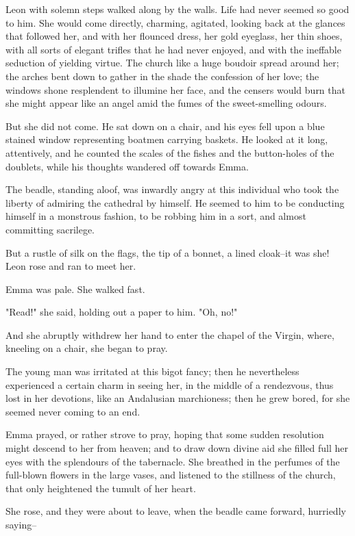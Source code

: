 \documentclass{tufte-book}
\begin{document}
Leon with solemn steps walked along by the walls. Life had never seemed
so good to him. She would come directly, charming, agitated, looking
back at the glances that followed her, and with her flounced dress, her
gold eyeglass, her thin shoes, with all sorts of elegant trifles that he
had never enjoyed, and with the ineffable seduction of yielding virtue.
The church like a huge boudoir spread around her; the arches bent down
to gather in the shade the confession of her love; the windows shone
resplendent to illumine her face, and the censers would burn that she
might appear like an angel amid the fumes of the sweet-smelling odours.

But she did not come. He sat down on a chair, and his eyes fell upon a
blue stained window representing boatmen carrying baskets. He looked at
it long, attentively, and he counted the scales of the fishes and the
button-holes of the doublets, while his thoughts wandered off towards
Emma.

The beadle, standing aloof, was inwardly angry at this individual who
took the liberty of admiring the cathedral by himself. He seemed to him
to be conducting himself in a monstrous fashion, to be robbing him in a
sort, and almost committing sacrilege.

But a rustle of silk on the flags, the tip of a bonnet, a lined
cloak--it was she! Leon rose and ran to meet her.

Emma was pale. She walked fast.

"Read!" she said, holding out a paper to him. "Oh, no!"

And she abruptly withdrew her hand to enter the chapel of the Virgin,
where, kneeling on a chair, she began to pray.

The young man was irritated at this bigot fancy; then he nevertheless
experienced a certain charm in seeing her, in the middle of a
rendezvous, thus lost in her devotions, like an Andalusian marchioness;
then he grew bored, for she seemed never coming to an end.

Emma prayed, or rather strove to pray, hoping that some sudden
resolution might descend to her from heaven; and to draw down divine
aid she filled full her eyes with the splendours of the tabernacle. She
breathed in the perfumes of the full-blown flowers in the large vases,
and listened to the stillness of the church, that only heightened the
tumult of her heart.

She rose, and they were about to leave, when the beadle came forward,
hurriedly saying--
\end{document}
